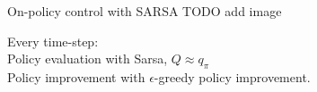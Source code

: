\bgroup
\begin{frame}{On-policy control with SARSA}
TODO add image

Every \textcolor{mImagelabRed}{time-step}:\\
\textcolor{mImagelabRed}{Policy evaluation} with \textcolor{mImagelabRed}{Sarsa}, $Q\approx q_{\pi}$\\
\textcolor{mImagelabRed}{Policy improvement} with $\epsilon$-greedy policy improvement.
\end{frame}
\egroup